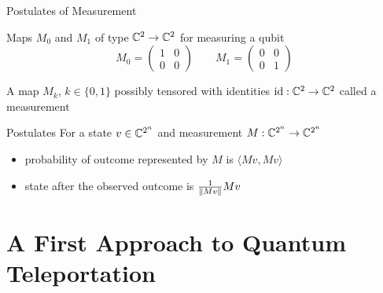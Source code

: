 \documentclass{beamer}
\begin{document}
\begin{frame}{Postulates of Measurement}

        Maps $M_0$ and $M_1$ of type $\mathbb{C}^2 \to \mathbb{C}^2$ for
        measuring a qubit
        \[
                M_0 = \begin{pmatrix}
                        1 & 0 \\
                        0 & 0 
                \end{pmatrix}
                \qquad
                M_1 = \begin{pmatrix}
                        0 & 0 \\
                        0 & 1
                \end{pmatrix}
        \]

        A map $M_k$, $k \in \{0,1\}$ possibly tensored with identities $\mathrm{id} :
        \mathbb{C}^2 \to \mathbb{C}^2$ called a \alert{measurement}

        \vfill
        \begin{block}{Postulates}
           For a state $v \in \mathbb{C}^{2^n}$ and measurement $M :
           \mathbb{C}^{2^n} \to \mathbb{C}^{2^n}$
           \begin{itemize}
                \item probability of outcome represented by $M$ is $\langle
                        M v, M v \rangle$
                \item state after the observed outcome is
                        $\textstyle{\frac{1}{\left\lVert M v\right\rVert}}M v$
           \end{itemize}         
        \end{block}
\end{frame}

\section{A First Approach to Quantum Teleportation}
\end{document}
